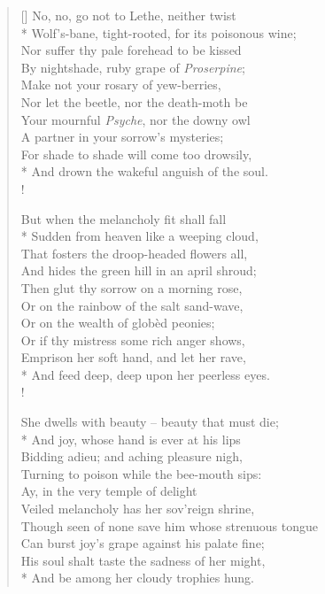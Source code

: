 \documentclass[MAIN]{subfiles}
\begin{document}
\settowidth{\versewidth}{\vin Wolf's-bane, tight-rooted, for its poisonous wine;}
\begin{verse}[\versewidth]
No, no, go not to {\sc Lethe}, neither twist\\* 
\vin Wolf's-bane, tight-rooted, for its poisonous wine;\\
Nor suffer thy pale forehead to be kissed\\
\vin By nightshade, ruby grape of \emph{Proserpine};\\
Make not your rosary of yew-berries,\\
\vin Nor let the beetle, nor the death-moth be\\
\vin \vin Your mournful \emph{Psyche}, nor the downy owl\\
A partner in your sorrow's mysteries;\\
\vin For shade to shade will come too drowsily,\\*
\vin \vin And drown the wakeful anguish of the soul.\\!

But when the melancholy fit shall fall\\*
\vin Sudden from heaven like a weeping cloud,\\
That fosters the droop-headed flowers all,\\
\vin And hides the green hill in an april shroud;\\
Then glut thy sorrow on a morning rose,\\
\vin Or on the rainbow of the salt sand-wave,\\
\vin \vin Or on the wealth of glob\`ed peonies;\\
Or if thy mistress some rich anger shows,\\
\vin Emprison her soft hand, and let her rave,\\*
\vin \vin And feed deep, deep upon her peerless eyes.\\!

She dwells with beauty -- beauty that must die;\\*
\vin And joy, whose hand is ever at his lips\\
Bidding adieu; and aching pleasure nigh,\\
\vin Turning to poison while the bee-mouth sips:\\
Ay, in the very temple of delight\\
\vin Veiled melancholy has her sov'reign shrine,\\
\vin \vin Though seen of none save him whose strenuous tongue\\
\vin Can burst joy's grape against his palate fine;\\
His soul shalt taste the sadness of her might,\\*
\vin \vin And be among her cloudy trophies hung.
\end{verse}
\end{document}
